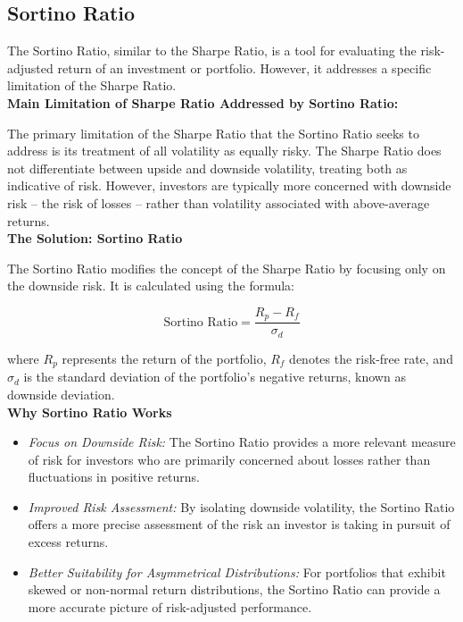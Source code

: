 \documentclass{article}
\begin{document}
\clearpage

\subsection{Sortino Ratio}

The Sortino Ratio, similar to the Sharpe Ratio, is a tool for evaluating the risk-adjusted return of an investment or portfolio. However, it addresses a specific limitation of the Sharpe Ratio. \\

\textbf{Main Limitation of Sharpe Ratio Addressed by Sortino Ratio:}

The primary limitation of the Sharpe Ratio that the Sortino Ratio seeks to address is its treatment of all volatility as equally risky. The Sharpe Ratio does not differentiate between upside and downside volatility, treating both as indicative of risk. However, investors are typically more concerned with downside risk -- the risk of losses -- rather than volatility associated with above-average returns. \\

\textbf{The Solution: Sortino Ratio}

The Sortino Ratio modifies the concept of the Sharpe Ratio by focusing only on the downside risk. It is calculated using the formula:

\begin{equation}
    \text{Sortino Ratio} = \frac{R_p - R_f}{\sigma_d}
\end{equation}

where \( R_p \) represents the return of the portfolio, \( R_f \) denotes the risk-free rate, and \( \sigma_d \) is the standard deviation of the portfolio's negative returns, known as downside deviation. \\

\textbf{Why Sortino Ratio Works}

\begin{itemize}
    \item \textit{Focus on Downside Risk:} The Sortino Ratio provides a more relevant measure of risk for investors who are primarily concerned about losses rather than fluctuations in positive returns.
    \item \textit{Improved Risk Assessment:} By isolating downside volatility, the Sortino Ratio offers a more precise assessment of the risk an investor is taking in pursuit of excess returns.
    \item \textit{Better Suitability for Asymmetrical Distributions:} For portfolios that exhibit skewed or non-normal return distributions, the Sortino Ratio can provide a more accurate picture of risk-adjusted performance.
\end{itemize}
\end{document}
